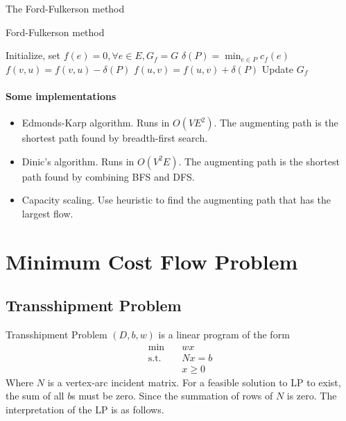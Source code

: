                     The Ford-Fulkerson method

                    \begin{algorithm}
                        \centering
                        \caption{Ford-Fulkerson method}
                        \begin{algorithmic}
                            \State Initialize, set $f(e) = 0, \forall e \in E, G_f = G$
                                \State $\delta(P) = \min_{e \in P} c_f(e)$
                                        \State $f(v, u) = f(v, u) - \delta(P)$
                                    \Else
                                        \State $f(u, v) = f(u, v) + \delta(P)$
                                    \EndIf
                                \EndFor
                                \State Update $G_f$
                            \EndWhile
                        \end{algorithmic}
                    \end{algorithm}

                \paragraph{Some implementations}
                    \begin{itemize}
                        \item Edmonds-Karp algorithm. Runs in $O(VE^2)$. The augmenting path is the shortest path found by breadth-first search.
                        \item Dinic's algorithm. Runs in $O(V^2E)$. The augmenting path is the shortest path found by combining BFS and DFS.
                        \item Capacity scaling. Use heuristic to find the augmenting path that has the largest flow.
                    \end{itemize}

        \section{Minimum Cost Flow Problem}
            \subsection{Transshipment Problem}
                Transshipment Problem $(D, b, w)$ is a linear program of the form
                \begin{align*}
                    \min \quad & wx\\
                    \text{s.t.} \quad & Nx = b\\
                                      & x \ge 0
                \end{align*}
                Where $N$ is a vertex-arc incident matrix. For a feasible solution to LP to exist, the sum of all $b$s must be zero. Since the summation of rows of $N$ is zero. The interpretation of the LP is as follows.

